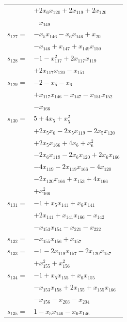 \begin{longtable}{@{}r@{\;}l@{}}
 & \(\displaystyle +2x_{6}x_{120} +2x_{119} +2x_{120}\) \\
 & \(\displaystyle -x_{149}\) \\[3pt]
\(s_{127}=\) & \(\displaystyle -x_{5}x_{146} -x_{6}x_{146} +x_{20}\) \\
 & \(\displaystyle -x_{146} +x_{147} +x_{149}x_{150}\) \\[3pt]
\(s_{128}=\) & \(\displaystyle -1 -x_{117}^{2} +2x_{117}x_{119}\) \\
 & \(\displaystyle +2x_{117}x_{120} -x_{151}\) \\[3pt]
\(s_{129}=\) & \(\displaystyle -2 -x_{5} -x_{6}\) \\
 & \(\displaystyle +x_{117}x_{146} -x_{147} -x_{151}x_{152}\) \\
 & \(\displaystyle -x_{166}\) \\[3pt]
\(s_{130}=\) & \(\displaystyle 5 +4x_{5} +x_{5}^{2}\) \\
 & \(\displaystyle +2x_{5}x_{6} -2x_{5}x_{119} -2x_{5}x_{120}\) \\
 & \(\displaystyle +2x_{5}x_{166} +4x_{6} +x_{6}^{2}\) \\
 & \(\displaystyle -2x_{6}x_{119} -2x_{6}x_{120} +2x_{6}x_{166}\) \\
 & \(\displaystyle -4x_{119} -2x_{119}x_{166} -4x_{120}\) \\
 & \(\displaystyle -2x_{120}x_{166} +x_{153} +4x_{166}\) \\
 & \(\displaystyle +x_{166}^{2}\) \\[3pt]
\(s_{131}=\) & \(\displaystyle -1 +x_{5}x_{141} +x_{6}x_{141}\) \\
 & \(\displaystyle +2x_{141} +x_{141}x_{166} -x_{142}\) \\
 & \(\displaystyle -x_{153}x_{154} -x_{221} -x_{222}\) \\[3pt]
\(s_{132}=\) & \(\displaystyle -x_{155}x_{156} +x_{157}\) \\[3pt]
\(s_{133}=\) & \(\displaystyle -1 -2x_{119}x_{157} -2x_{120}x_{157}\) \\
 & \(\displaystyle +x_{155}^{2} +x_{156}^{2}\) \\[3pt]
\(s_{134}=\) & \(\displaystyle -1 +x_{5}x_{155} +x_{6}x_{155}\) \\
 & \(\displaystyle -x_{153}x_{158} +2x_{155} +x_{155}x_{166}\) \\
 & \(\displaystyle -x_{156} -x_{203} -x_{204}\) \\[3pt]
\(s_{135}=\) & \(\displaystyle 1 -x_{5}x_{146} -x_{6}x_{146}\) \\

\end{longtable}
